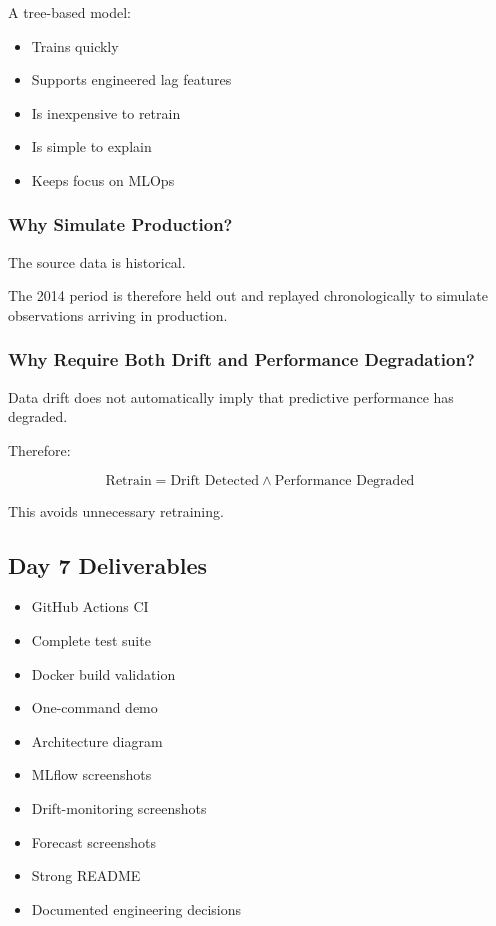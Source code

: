 \documentclass[11pt,a4paper]{article}
\newcommand{\done}{\textbf{\textcolor{codegreen}{✓}}}
\begin{document}
A tree-based model:

\begin{itemize}
    \item Trains quickly
    \item Supports engineered lag features
    \item Is inexpensive to retrain
    \item Is simple to explain
    \item Keeps focus on MLOps
\end{itemize}

\subsubsection{Why Simulate Production?}

The source data is historical.

The 2014 period is therefore held out and replayed chronologically to simulate observations arriving in production.

\subsubsection{Why Require Both Drift and Performance Degradation?}

Data drift does not automatically imply that predictive performance has degraded.

Therefore:

\[
\text{Retrain}
=
\text{Drift Detected}
\land
\text{Performance Degraded}
\]

This avoids unnecessary retraining.

\subsection{Day 7 Deliverables}

\begin{itemize}
    \item[\done] GitHub Actions CI
    \item[\done] Complete test suite
    \item[\done] Docker build validation
    \item[\done] One-command demo
    \item[\done] Architecture diagram
    \item[\done] MLflow screenshots
    \item[\done] Drift-monitoring screenshots
    \item[\done] Forecast screenshots
    \item[\done] Strong README
    \item[\done] Documented engineering decisions
\end{itemize}
\end{document}
